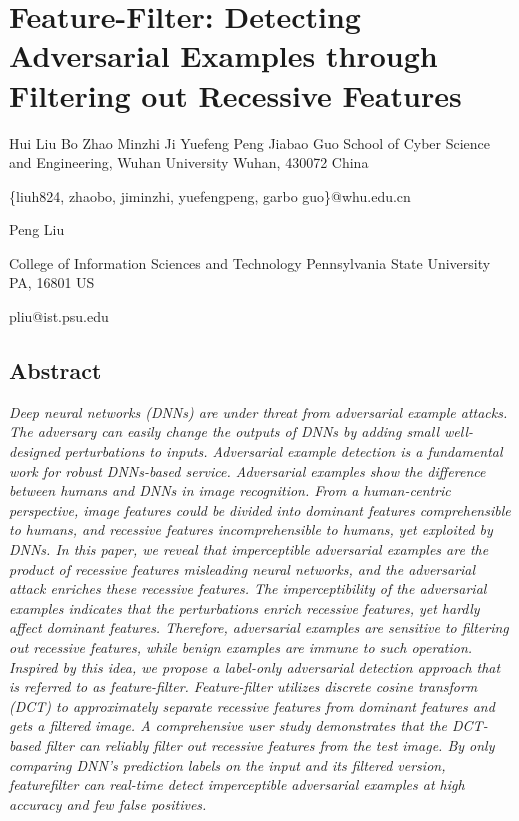 \documentclass{article}
\begin{document}
\section{Feature-Filter: Detecting Adversarial Examples through Filtering out Recessive Features}

Hui Liu Bo Zhao Minzhi Ji Yuefeng Peng Jiabao Guo School of Cyber Science and Engineering, Wuhan University Wuhan, 430072 China

\{liuh824, zhaobo, jiminzhi, yuefengpeng, garbo guo\}@whu.edu.cn

Peng Liu

College of Information Sciences and Technology Pennsylvania State University PA, 16801 US

pliu@ist.psu.edu

\subsection{Abstract}

\textit{Deep neural networks (DNNs) are under threat from adversarial example attacks. The adversary can easily change the outputs of DNNs by adding small well-designed perturbations to inputs. Adversarial example detection is a fundamental work for robust DNNs-based service. Adversarial examples show the difference between humans and DNNs in image recognition. From a human-centric perspective, image features could be divided into dominant features comprehensible to humans, and recessive features incomprehensible to humans, yet exploited by DNNs. In this paper, we reveal that imperceptible adversarial examples are the product of recessive features misleading neural networks, and the adversarial attack enriches these recessive features. The imperceptibility of the adversarial examples indicates that the perturbations enrich recessive features, yet hardly affect dominant features. Therefore, adversarial examples are sensitive to filtering out recessive features, while benign examples are immune to such operation. Inspired by this idea, we propose a label-only adversarial detection approach that is referred to as feature-filter. Feature-filter utilizes discrete cosine transform (DCT) to approximately separate recessive features from dominant features and gets a filtered image. A comprehensive user study demonstrates that the DCT-based filter can reliably filter out recessive features from the test image. By only comparing DNN's prediction labels on the input and its filtered version, featurefilter can real-time detect imperceptible adversarial examples at high accuracy and few false positives.}
\end{document}

